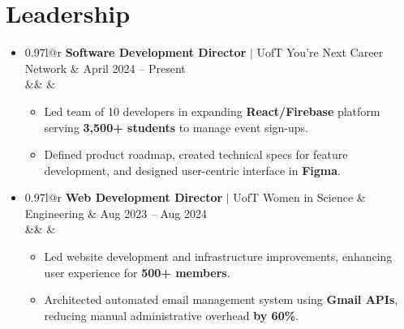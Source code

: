 \documentclass[letterpaper,11pt]{article}
\makeatletter
\newcommand{\resumeItem}[1]{
  \item\small{
    {#1}
  }
}
\newcommand{\resumeProjectHeading}[4]{
    \item
    \begin{tabular*}{0.97\textwidth}{l@{\extracolsep{\fill}}r}
      \small#1 & \small#2 \\
      \ifx&#3&%
      \else
        {\small#3} & {\small#4} \\
       \fi
    \end{tabular*}\vspace{-7pt}
}
\newcommand{\resumeSubHeadingListStart}{\begin{itemize}[leftmargin=0.15in, label={}]}
\newcommand{\resumeSubHeadingListEnd}{\end{itemize}}
\newcommand{\resumeItemListStart}{\begin{itemize}}
\newcommand{\resumeItemListEnd}{\end{itemize}\vspace{-10pt}}
\makeatother
\begin{document}
  \section{Leadership}
  \resumeSubHeadingListStart
  \resumeProjectHeading
        {\textbf{Software Development Director} $|$ UofT You're Next Career Network}{April 2024 -- Present}{}{}
      \resumeItemListStart
          \resumeItem{Led team of 10 developers in expanding \textbf{React/Firebase} platform serving \textbf{3,500+ students} to manage event sign-ups.}
          \resumeItem{Defined product roadmap, created technical specs for feature development, and designed user-centric interface in \textbf{Figma}.}
      \resumeItemListEnd
      \resumeProjectHeading
      {\textbf{Web Development Director} $|$ UofT Women in Science \& Engineering}{Aug 2023 -- Aug 2024}{}{}
      \resumeItemListStart
        \resumeItem{Led website development and infrastructure improvements, enhancing user experience for \textbf{500+ members}.}
        \resumeItem{Architected automated email management system using \textbf{Gmail APIs}, reducing manual administrative overhead \textbf{by 60\%}.}
      \resumeItemListEnd
  \resumeSubHeadingListEnd
\end{document}
